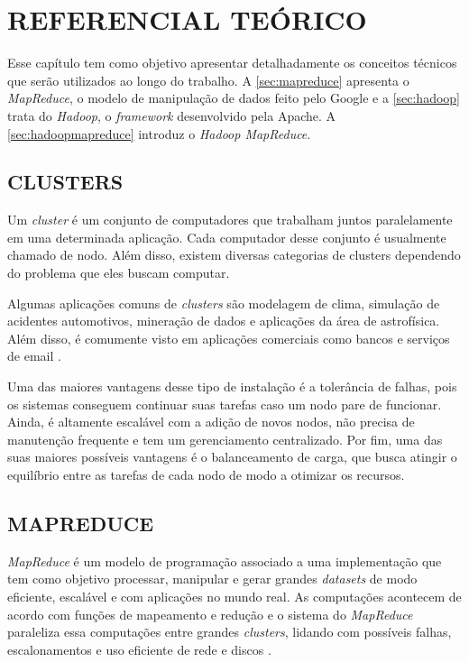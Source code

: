 \chapter{REFERENCIAL TEÓRICO} \label{cha:refteorico}

Esse capítulo tem como objetivo apresentar detalhadamente os conceitos técnicos que serão utilizados ao longo do trabalho. A \autoref{sec:mapreduce} apresenta o \textit{MapReduce}, o modelo de manipulação de dados feito pelo Google e a \autoref{sec:hadoop} trata do \textit{Hadoop}, o \textit{framework} desenvolvido pela Apache. A \autoref{sec:hadoopmapreduce} introduz o \textit{Hadoop MapReduce}.

\section{CLUSTERS} \label{sec:clusters}

Um \textit{cluster} é um conjunto de computadores que trabalham juntos paralelamente em uma determinada aplicação. Cada computador desse conjunto é usualmente chamado de nodo. Além disso, existem diversas categorias de clusters dependendo do problema que eles buscam computar.

Algumas aplicações comuns de \textit{clusters} são modelagem de clima, simulação de acidentes automotivos, mineração de dados e aplicações da área de astrofísica. Além disso, é comumente visto em aplicações comerciais como bancos e serviços de email \cite{ClusterGridCloudComparison11}.

Uma das maiores vantagens desse tipo de instalação é a tolerância de falhas, pois os sistemas conseguem continuar suas tarefas caso um nodo pare de funcionar. Ainda, é altamente escalável com a adição de novos nodos, não precisa de manutenção frequente e tem um gerenciamento centralizado. Por fim, uma das suas maiores possíveis vantagens é o balanceamento de carga, que busca atingir o equilíbrio entre as tarefas de cada nodo de modo a otimizar os recursos.

\section{MAPREDUCE} \label{sec:mapreduce}

\textit{MapReduce} é um modelo de programação associado a uma implementação que tem como objetivo processar, manipular e gerar grandes \textit{datasets} de modo eficiente, escalável e com aplicações no mundo real. As computações acontecem de acordo com funções de mapeamento e redução e o sistema do \textit{MapReduce} paraleliza essa computações entre grandes \textit{clusters}, lidando com possíveis falhas, escalonamentos e uso eficiente de rede e discos \cite{MapReduce08}.

